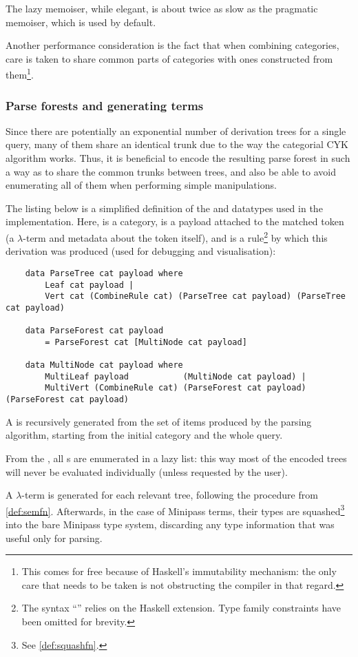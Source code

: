 \documentclass[main.tex]{subfiles}
\begin{document}
The lazy memoiser, while elegant, is about twice as slow as the pragmatic
memoiser, which is used by default.

Another performance consideration is the fact that when combining categories,
care is taken to share common parts of categories with ones constructed from
them\footnote{This comes for free because of Haskell's immutability mechanism:
    the only care that needs to be taken is not obstructing the compiler in
    that regard.
}.

\subsubsection{Parse forests and generating terms}\label{sec:termgen}
Since there are potentially an exponential number of derivation trees for a
single query, many of them share an identical trunk due to the way
the categorial CYK algorithm works. Thus, it is beneficial to encode the resulting
parse forest in such a way as to share the common trunks between trees, and
also be able to avoid enumerating all of them when performing simple manipulations.

The listing below is a simplified definition of the  and 
datatypes used in the implementation. Here,  is a category,
 is a payload attached to the matched token (a $\lambda$-term and
metadata about the token itself), and  is a rule\footnote{
    The syntax ``'' relies on the 
    Haskell extension. Type family constraints have been omitted for brevity.
} by which this derivation was produced (used for debugging and visualisation):
\begin{lstwrap}\begin{lstlisting}
    data ParseTree cat payload where
        Leaf cat payload |
        Vert cat (CombineRule cat) (ParseTree cat payload) (ParseTree cat payload)

    data ParseForest cat payload
        = ParseForest cat [MultiNode cat payload]

    data MultiNode cat payload where
        MultiLeaf payload           (MultiNode cat payload) |
        MultiVert (CombineRule cat) (ParseForest cat payload) (ParseForest cat payload)
\end{lstlisting}\end{lstwrap}

A  is recursively generated from the set of items produced
by the parsing algorithm, starting from the initial category and the whole query.

From the , all s are enumerated in a lazy
list: this way most of the encoded trees will never be evaluated individually
(unless requested by the user).

A $\lambda$-term is generated for each relevant tree, following the procedure
from \cref{def:semfn}. Afterwards, in the case of Minipass terms, their types are
squashed\footnote{See \cref{def:squashfn}.} into the bare Minipass type system,
discarding any type information that was useful only for parsing.
\end{document}

